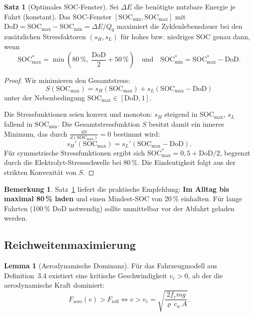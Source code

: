 ﻿\documentclass[a4paper,12pt]{article}
\theoremstyle{definition}
\newtheorem{satz}{Satz}
\newtheorem{lemma}{Lemma}
\newtheorem{bemerkung}{Bemerkung}
\begin{document}
\begin{satz}[Optimales SOC-Fenster]
\label{satz:soc}
  Sei $\Delta E$ die ben\"otigte nutzbare Energie je Fahrt (konstant).
  Das SOC-Fenster $[\mathrm{SOC}_{\min}, \mathrm{SOC}_{\max}]$ mit
  $\mathrm{DoD} = \mathrm{SOC}_{\max} - \mathrm{SOC}_{\min} = \Delta E / Q_0$
  maximiert die Zyklenlebensdauer bei den zus\"atzlichen Stressfaktoren
  $(s_H, s_L)$ f\"ur hohes bzw. niedriges SOC genau dann, wenn
  \[
    \mathrm{SOC}_{\max}^* = \min\!\left(80\,\%, \; \frac{\mathrm{DoD}}{2} + 50\,\%\right)
    \quad\text{und}\quad
    \mathrm{SOC}_{\min}^* = \mathrm{SOC}_{\max}^* - \mathrm{DoD}.
  \]
\end{satz}

\begin{proof}
  Wir minimieren den Gesamtstress:
  \[
    S(\mathrm{SOC}_{\max}) = s_H(\mathrm{SOC}_{\max}) + s_L(\mathrm{SOC}_{\max} - \mathrm{DoD})
  \]
  unter der Nebenbedingung $\mathrm{SOC}_{\max} \in [\mathrm{DoD}, 1]$.

  Die Stressfunktionen seien konvex und monoton:
  $s_H$ steigend in $\mathrm{SOC}_{\max}$, $s_L$ fallend in $\mathrm{SOC}_{\min}$.
  Die Gesamtstressfunktion $S$ besitzt damit ein inneres Minimum, das durch
  $\frac{dS}{d(\mathrm{SOC}_{\max})} = 0$ bestimmt wird:
  \[
    s_H'(\mathrm{SOC}_{\max}) = s_L'(\mathrm{SOC}_{\max} - \mathrm{DoD}).
  \]
  F\"ur symmetrische Stressfunktionen ergibt sich $\mathrm{SOC}_{\max}^* = 0{,}5 + \mathrm{DoD}/2$,
  begrenzt durch die Elektrolyt-Stressschwelle bei 80\,\%.
  Die Eindeutigkeit folgt aus der strikten Konvexit\"at von $S$.
\end{proof}

\begin{bemerkung}
  Satz~\ref{satz:soc} liefert die praktische Empfehlung: \textbf{Im Alltag
  bis maximal 80\,\% laden} und einen Mindest-SOC von 20\,\% einhalten.
  F\"ur lange Fahrten (100\,\% DoD notwendig) sollte unmittelbar vor der
  Abfahrt geladen werden.
\end{bemerkung}

\subsection{Reichweitenmaximierung}

\begin{lemma}[Aerodynamische Dominanz]
\label{lem:aero}
  F\"ur das Fahrzeugmodell aus Definition~3.4 existiert eine kritische
  Geschwindigkeit $v_c > 0$, ab der die aerodynamische Kraft dominiert:
  \[
    F_{\mathrm{aero}}(v) > F_{\mathrm{roll}} \iff v > v_c = \sqrt{\frac{2 f_r m g}{\varrho\, c_w\, A}}.
  \]
\end{lemma}
\end{document}
